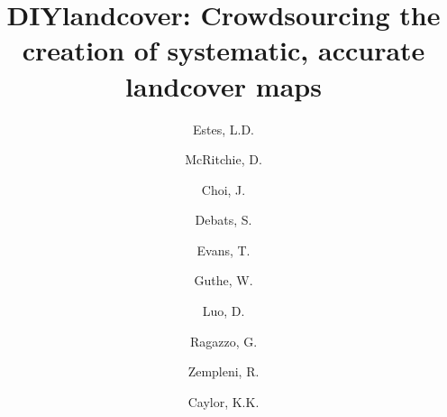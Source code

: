 \documentclass[preprint,12pt,authoryear]{elsarticle}
\begin{document}
\begin{frontmatter}



\title{DIYlandcover: Crowdsourcing the creation of systematic, accurate landcover maps}


\author[label1,label2]{Estes, L.D. }
\author[label3]{McRitchie, D.}
\author[label1]{Choi, J.}
\author[label1]{Debats, S.}
\author[label4]{Evans, T.}
\author[label1]{Guthe, W.}
\author[label1]{Luo, D.}
\author[label1]{Ragazzo, G.}
\author[label1]{Zempleni, R.}
\author[label1]{Caylor, K.K.}

\address[label1]{Civil and Environmental Engineering, Princeton University, Princeton, NJ, 08544 USA}
\address[label2]{Woodrow Wilson School, Princeton University, Princeton, NJ, 08544 USA}
\address[label3]{Computational Science and Engineering Support, Office of Information Technology, Princeton University, Princeton, NJ, 08544 USA}
\address[label4]{Department of Geography, Indiana University, Bloomington, IN 47405 USA}


\end{frontmatter}
\end{document}
